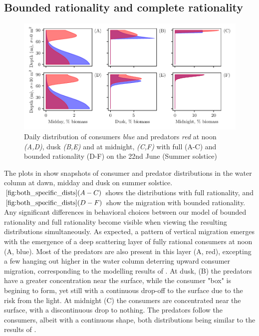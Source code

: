 \subsection*{Bounded rationality and complete rationality}
\begin{figure}[H]
\includegraphics{plots/both_specific_dists.pdf}
\caption{Daily distribution of consumers \emph{blue} and predators \emph{red} at noon \emph{(A,D)}, dusk \emph{(B,E)} and at midnight, \emph{(C,F)} with full (A-C) and bounded rationality (D-F) on the 22nd June (Summer solstice)}
\label{fig:both_specific_dists}
\end{figure}
The plots in  show snapshots of consumer and predator distributions in the water column at dawn, midday and dusk on summer solstice. $\Cref{fig:both_specific_dists} (A-C)$ shows the distributions with full rationality, and $\Cref{fig:both_specific_dists} (D-F)$ show the migration with bounded rationality. Any significant differences in behavioral choices between our model of bounded rationality and full rationality become visible when viewing the resulting distributions simultaneously. As expected, a pattern of vertical migration emerges with the emergence of a deep scattering layer of fully rational consumers at noon (A, blue). Most of the predators are also present in this layer (A, red), excepting a few hanging out higher in the water column deterring upward consumer migration, corresponding to the modelling results of \citep{jerome}. At dusk, (B) the predators have a greater concentration near the surface, while the consumer "box" is begining to form, yet still with a continuous drop-off to the surface due to the risk from the light. At midnight (C) the consumers are concentrated near the surface, with a discontinuous drop to nothing. The predators follow the consumers, albeit with a continuous shape, both distributions being similar to the results of \citep{verticalmigration}.


